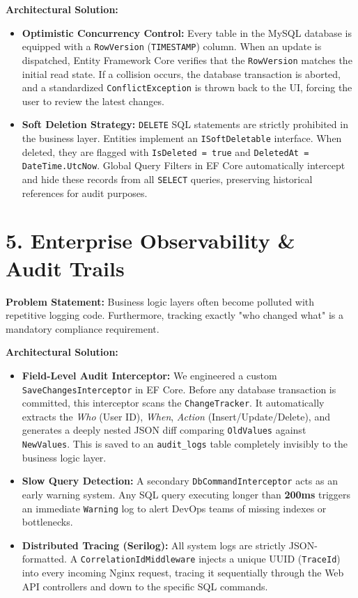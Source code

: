 \documentclass[12pt,a4paper]{article}
\begin{document}
\textbf{Architectural Solution:} 
\begin{itemize}[label=\textbullet]
    \item \textbf{Optimistic Concurrency Control:} Every table in the MySQL database is equipped with a \texttt{RowVersion} (\texttt{TIMESTAMP}) column. When an update is dispatched, Entity Framework Core verifies that the \texttt{RowVersion} matches the initial read state. If a collision occurs, the database transaction is aborted, and a standardized \texttt{ConflictException} is thrown back to the UI, forcing the user to review the latest changes.
    \item \textbf{Soft Deletion Strategy:} \texttt{DELETE} SQL statements are strictly prohibited in the business layer. Entities implement an \texttt{ISoftDeletable} interface. When deleted, they are flagged with \texttt{IsDeleted = true} and \texttt{DeletedAt = DateTime.UtcNow}. Global Query Filters in EF Core automatically intercept and hide these records from all \texttt{SELECT} queries, preserving historical references for audit purposes.
\end{itemize}

\newpage
\section{5. Enterprise Observability \& Audit Trails}

\textbf{Problem Statement:} Business logic layers often become polluted with repetitive logging code. Furthermore, tracking exactly "who changed what" is a mandatory compliance requirement.

\textbf{Architectural Solution:}
\begin{itemize}[label=\textbullet]
    \item \textbf{Field-Level Audit Interceptor:} We engineered a custom \texttt{SaveChangesInterceptor} in EF Core. Before any database transaction is committed, this interceptor scans the \texttt{ChangeTracker}. It automatically extracts the \textit{Who} (User ID), \textit{When}, \textit{Action} (Insert/Update/Delete), and generates a deeply nested JSON diff comparing \texttt{OldValues} against \texttt{NewValues}. This is saved to an \texttt{audit\_logs} table completely invisibly to the business logic layer.
    \item \textbf{Slow Query Detection:} A secondary \texttt{DbCommandInterceptor} acts as an early warning system. Any SQL query executing longer than \textbf{200ms} triggers an immediate \texttt{Warning} log to alert DevOps teams of missing indexes or bottlenecks.
    \item \textbf{Distributed Tracing (Serilog):} All system logs are strictly JSON-formatted. A \texttt{CorrelationIdMiddleware} injects a unique UUID (\texttt{TraceId}) into every incoming Nginx request, tracing it sequentially through the Web API controllers and down to the specific SQL commands.
\end{itemize}
\end{document}
